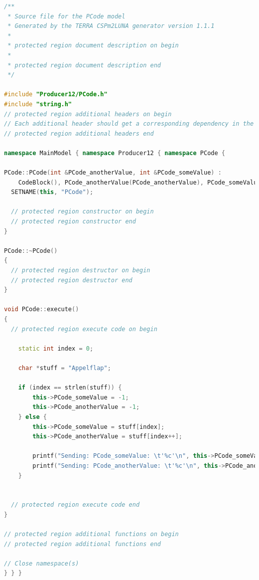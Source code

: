 \documentclass[a4paper,twoside,11pt]{article}
\begin{document}
\begin{lstlisting}[caption=Producer12/PCode.cpp, label=code:1_2producer, language=C++]
/**
 * Source file for the PCode model
 * Generated by the TERRA CSPm2LUNA generator version 1.1.1
 *
 * protected region document description on begin
 *
 * protected region document description end
 */

#include "Producer12/PCode.h"
#include "string.h"
// protected region additional headers on begin
// Each additional header should get a corresponding dependency in the Makefile
// protected region additional headers end

namespace MainModel { namespace Producer12 { namespace PCode { 

PCode::PCode(int &PCode_anotherValue, int &PCode_someValue) :
    CodeBlock(), PCode_anotherValue(PCode_anotherValue), PCode_someValue(PCode_someValue){
  SETNAME(this, "PCode");

  // protected region constructor on begin
  // protected region constructor end
}

PCode::~PCode()
{
  // protected region destructor on begin
  // protected region destructor end
}

void PCode::execute()
{
  // protected region execute code on begin

	static int index = 0;

	char *stuff = "Appelflap";

	if (index == strlen(stuff)) {
		this->PCode_someValue = -1;
		this->PCode_anotherValue = -1;
	} else {
		this->PCode_someValue = stuff[index];
		this->PCode_anotherValue = stuff[index++];

		printf("Sending: PCode_someValue: \t'%c'\n", this->PCode_someValue);
		printf("Sending: PCode_anotherValue: \t'%c'\n", this->PCode_anotherValue);
	}


  // protected region execute code end
}

// protected region additional functions on begin
// protected region additional functions end

// Close namespace(s)
} } } 
\end{lstlisting}
\end{document}

